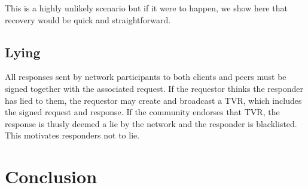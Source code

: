 \documentclass{article}
\begin{document}
This is a highly unlikely scenario but if it were to happen, we show here that recovery would be quick and straightforward.

\subsection{Lying}

All responses sent by network participants to both clients and peers must be signed together with the associated request. If the requestor thinks the responder has lied to them, the requestor may create and broadcast a TVR, which includes the signed request and response. If the community endorses that TVR, the response is thusly deemed a lie by the network and the responder is blacklisted. This motivates responders not to lie.

\section{Conclusion}
\end{document}

